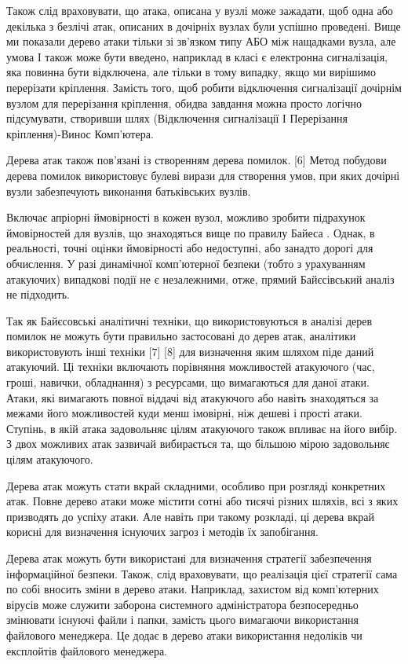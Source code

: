 \documentclass[oneside,final,14pt]{extreport}
\begin{document}
Також слід враховувати, що атака, описана у вузлі може зажадати, щоб одна або декілька з безлічі атак, описаних в дочірніх вузлах були успішно проведені. Вище ми показали дерево атаки тільки зі зв'язком типу АБО між нащадками вузла, але умова І також може бути введено, наприклад в класі є електронна сигналізація, яка повинна бути відключена, але тільки в тому випадку, якщо ми вирішимо перерізати кріплення. Замість того, щоб робити відключення сигналізації дочірнім вузлом для перерізання кріплення, обидва завдання можна просто логічно підсумувати, створивши шлях (Відключення сигналізації І Перерізання кріплення)-Винос Комп'ютера.

Дерева атак також пов'язані із створенням дерева помилок. {[}6{]} Метод побудови дерева помилок використовує булеві вирази для створення умов, при яких дочірні вузли забезпечують виконання батьківських вузлів.

Включає апріорні ймовірності в кожен вузол, можливо зробити підрахунок ймовірностей для вузлів, що знаходяться вище по правилу Байеса . Однак, в реальності, точні оцінки ймовірності або недоступні, або занадто дорогі для обчислення. У разі динамічної комп'ютерної безпеки (тобто з урахуванням атакуючих) випадкові події не є незалежними, отже, прямий Байєсівський аналіз не підходить.

Так як Байєсовські аналітичні техніки, що використовуються в аналізі дерев помилок не можуть бути правильно застосовані до дерев атак, аналітики використовують інші техніки {[}7{]} {[}8{]} для визначення яким шляхом піде даний атакуючий. Ці техніки включають порівняння можливостей атакуючого (час, гроші, навички, обладнання) з ресурсами, що вимагаються для даної атаки. Атаки, які вимагають повної віддачі від атакуючого або навіть знаходяться за межами його можливостей куди менш імовірні, ніж дешеві і прості атаки. Ступінь, в якій атака задовольняє цілям атакуючого також впливає на його вибір. З двох можливих атак зазвичай вибирається та, що більшою мірою задовольняє цілям атакуючого.

Дерева атак можуть стати вкрай складними, особливо при розгляді конкретних атак. Повне дерево атаки може містити сотні або тисячі різних шляхів, всі з яких призводять до успіху атаки. Але навіть при такому розкладі, ці дерева вкрай корисні для визначення існуючих загроз і методів їх запобігання.

Дерева атак можуть бути використані для визначення стратегії забезпечення інформаційної безпеки. Також, слід враховувати, що реалізація цієї стратегії сама по собі вносить зміни в дерево атаки. Наприклад, захистом від комп'ютерних вірусів може служити заборона системного адміністратора безпосередньо змінювати існуючі файли і папки, замість цього вимагаючи використання файлового менеджера. Це додає в дерево атаки використання недоліків чи експлойтів файлового менеджера.
\end{document}
